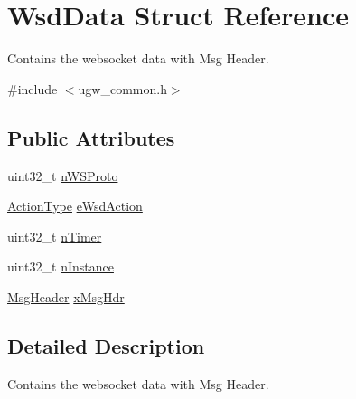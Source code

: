 \hypertarget{structWsdData}{\section{Wsd\-Data Struct Reference}
\label{structWsdData}
}


Contains the websocket data with Msg Header.  




{\ttfamily \#include $<$ugw\-\_\-common.\-h$>$}

\subsection*{Public Attributes}
\begin{DoxyCompactItemize}
\item 
uint32\-\_\-t \hyperlink{structWsdData_a349311d9b1b3775f0a2e34fba656b8a9}{n\-W\-S\-Proto}
\item 
\hyperlink{group__LIBHELP_ga21d5e8f8cdaa838586b31007df0a950b}{Action\-Type} \hyperlink{structWsdData_aca064594dec04944d586de98018175e7}{e\-Wsd\-Action}
\item 
uint32\-\_\-t \hyperlink{structWsdData_a9047f519a025fe4b44967b7728839e8e}{n\-Timer}
\item 
uint32\-\_\-t \hyperlink{structWsdData_a4050bfba1723b70da1250285635feec3}{n\-Instance}
\item 
\hyperlink{structMsgHeader}{Msg\-Header} \hyperlink{structWsdData_a3232d4832bfa0ff6d0cf6d34aede399a}{x\-Msg\-Hdr}
\end{DoxyCompactItemize}


\subsection{Detailed Description}
Contains the websocket data with Msg Header. 

